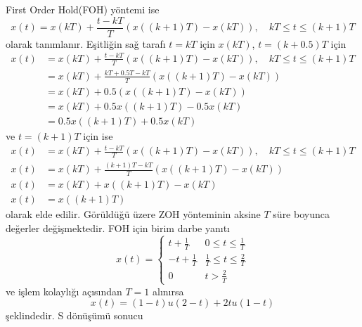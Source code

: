 First Order Hold(FOH) yöntemi ise
\begin{equation}
    x(t)=x(kT)+\frac{t-kT}{T}(x((k+1)T)-x(kT)),\quad kT\leq t\leq (k+1)T
\end{equation}
olarak tanımlanır. Eşitliğin sağ tarafı $t=kT$ için $x(kT)$, $t=(k+0.5)T$ için 
\begin{equation}
\begin{split}
    x(t)&=x(kT)+\frac{t-kT}{T}(x((k+1)T)-x(kT)),\quad kT\leq t\leq (k+1)T\\
    &=x(kT)+\frac{kT+0.5T-kT}{T}(x((k+1)T)-x(kT))\\
    &=x(kT)+0.5(x((k+1)T)-x(kT))\\
    &=x(kT)+0.5x((k+1)T)-0.5x(kT)\\
    &=0.5x((k+1)T)+0.5x(kT)
\end{split}
\end{equation}
ve $t=(k+1)T$ için ise 
\begin{equation}
    \begin{split}
        x(t)&=x(kT)+\frac{t-kT}{T}(x((k+1)T)-x(kT)),\quad kT\leq t\leq (k+1)T\\
        x(t)&=x(kT)+\frac{(k+1)T-kT}{T}(x((k+1)T)-x(kT))\\
        x(t)&=x(kT)+x((k+1)T)-x(kT)\\
        x(t)&=x((k+1)T)
    \end{split}
\end{equation}
olarak elde edilir. Görüldüğü üzere ZOH yönteminin aksine $T$ süre boyunca değerler değişmektedir. FOH için birim darbe yanıtı
\begin{equation}
    x(t)=\begin{cases}
        t+\frac{1}{T} & 0\leq t\leq \frac{1}{T}\\
        -t+\frac{1}{T} & \frac{1}{T}\leq t\leq \frac{2}{T}\\
        0 & t>\frac{2}{T}
    \end{cases}
\end{equation}
ve işlem kolaylığı açısından $T=1$ alınırsa 
\begin{equation}
    x(t)=(1-t)u(2-t)+2tu(1-t)
\end{equation}
şeklindedir. S dönüşümü sonucu
